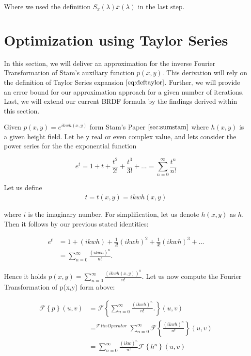 Where we used the definition $S_x(\lambda)\overline{x}(\lambda)$ in the last step.

\section{Optimization using Taylor Series}
\label{sec:taylorapproximation}
In this section, we will deliver an approximation for the inverse Fourier Transformation of Stam's auxiliary function $p(x,y)$. This derivation will rely on the definition of Taylor Series expansion $\ref{eq:deftaylor}$. Further, we will provide an error bound for our approximation approach for a given number of iterations. Last, we will extend our current BRDF formula by the findings derived within this section.

Given $p(x,y)=e^{ikwh(x,y)}$ form Stam's Paper $\ref{sec:sumstam}$ where $h(x,y)$ is a given height field. Let be y real or even complex value, and lets consider the power series for the the exponential function
 
\begin{equation}
  e^{t}=1+t+\frac{t^{2}}{2!}+\frac{t^{3}}{3!}+...=\sum_{n=0}^{\infty}\frac{t^{n}}{n!}
\end{equation}

Let us define 
\begin{align}
t 
= t(x,y) 
= ikwh(x,y)
\end{align}
 
where $i$ is the imaginary number. For simplification, let us denote $h(x,y)$ as $h$. Then it follows by our previous stated identities: 

\begin{align}
 e^{t}
 &=1+(ikwh)+\frac{1}{2!}(ikwh)^{2}+\frac{1}{3!}(ikwh)^{3}+... \nonumber \\
 &=\sum_{n=0}^{\infty}\frac{(ikwh)^{n}}{n!}.
\end{align}

Hence it holds $p(x,y)=\sum_{n=0}^{\infty}\frac{(ikwh(x,y))^{n}}{n!}$. Let us now compute the Fourier Transformation of p(x,y) form above:

\begin{align}
  \mathcal{F}\left\{ p\right\}(u,v)
  & =\mathcal{F}\left\{ \sum_{n=0}^{\infty}\frac{(ikwh)^{n}}{n!}.\right\}(u,v) \nonumber \\
  & =^{\mathcal{F}\, lin\, Operator}\sum_{n=0}^{\infty}\mathcal{F}\left\{ \frac{(ikwh)^{n}}{n!}\right\}(u,v) \nonumber \\
  & =\sum_{n=0}^{\infty}\frac{(ikw)^{n}}{n!}\mathcal{F}\left\{ h{}^{n}\right\}(u,v)
\end{align}

